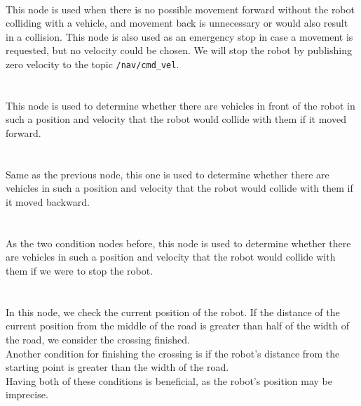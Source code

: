     \\
        This node is used when there is no possible movement forward without the robot colliding with a vehicle, and movement back is unnecessary or would also result in a collision. This node is also used as an emergency stop in case a movement is requested, but no velocity could be chosen. We will stop the robot by publishing zero velocity to the topic \texttt{/nav/cmd\_vel}.\\\\
    \\
        This node is used to determine whether there are vehicles in front of the robot in such a position and velocity that the robot would collide with them if it moved forward.\\\\
    \\
        Same as the previous node, this one is used to determine whether there are vehicles in such a position and velocity that the robot would collide with them if it moved backward.\\\\
    \\
        As the two condition nodes before, this node is used to determine whether there are vehicles in such a position and velocity that the robot would collide with them if we were to stop the robot.\\\\
    \\
        In this node, we check the current position of the robot. If the distance of the current position from the middle of the road is greater than half of the width of the road, we consider the crossing finished.\\
        Another condition for finishing the crossing is if the robot's distance from the starting point is greater than the width of the road.\\
        Having both of these conditions is beneficial, as the robot's position may be imprecise.
